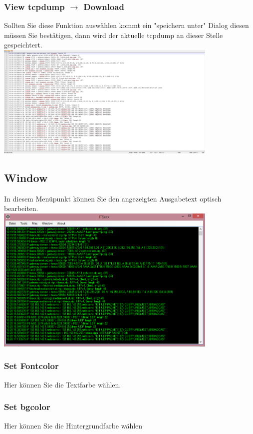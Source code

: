 \documentclass[11pt]{article} %
\begin{document}
\subsubsection{View tcpdump $\rightarrow$ Download}
Sollten Sie diese Funktion auswählen kommt ein "speichern unter" Dialog diesen müssen Sie bestätigen, dann wird der aktuelle tcpdump an dieser Stelle gespeichtert.
\\
\includegraphics[width=0.8\textwidth]{tcpd}
\\
\pagebreak
\subsection{Window}
In diesem Menüpunkt können Sie den angezeigten Ausgabetext optisch bearbeiten.\\
\includegraphics[width=0.8\textwidth]{colors}
\subsubsection{Set Fontcolor}
Hier können Sie die Textfarbe wählen.\\
\subsubsection{Set bgcolor}
Hier können Sie die Hintergrundfarbe wählen
\end{document}
